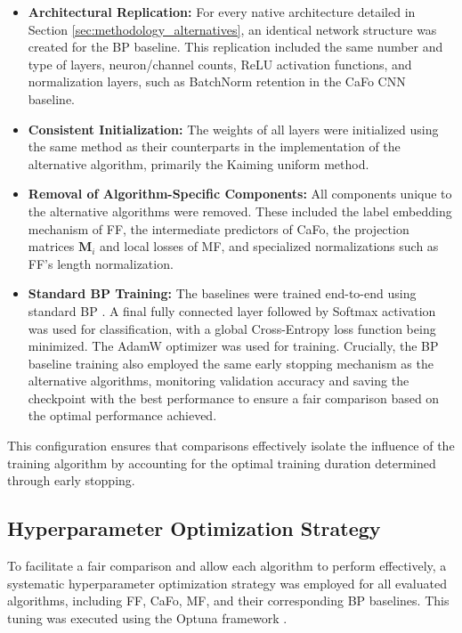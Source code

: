 \begin{itemize}
    \item \textbf{Architectural Replication:} For every native architecture detailed in Section \ref{sec:methodology_alternatives}, an identical network structure was created for the BP baseline. This replication included the same number and type of layers, neuron/channel counts, ReLU activation functions, and normalization layers, such as BatchNorm retention in the CaFo CNN baseline.
    \item \textbf{Consistent Initialization:} The weights of all layers were initialized using the same method as their counterparts in the implementation of the alternative algorithm, primarily the Kaiming uniform method.
    \item \textbf{Removal of Algorithm-Specific Components:} All components unique to the alternative algorithms were removed. These included the label embedding mechanism of FF, the intermediate predictors of CaFo, the projection matrices $\mathbf{M}_i$ and local losses of MF, and specialized normalizations such as FF's length normalization.
    \item \textbf{Standard BP Training:} The baselines were trained end-to-end using standard BP \cite{rumelhart1986learning}. A final fully connected layer followed by Softmax activation was used for classification, with a global Cross-Entropy loss function being minimized. The AdamW optimizer \cite{loshchilov2017decoupled} was used for training. Crucially, the BP baseline training also employed the same early stopping mechanism as the alternative algorithms, monitoring validation accuracy and saving the checkpoint with the best performance to ensure a fair comparison based on the optimal performance achieved.
\end{itemize}
This configuration ensures that comparisons effectively isolate the influence of the training algorithm by accounting for the optimal training duration determined through early stopping.

\subsection{Hyperparameter Optimization Strategy}
\label{sec:methodology_hyperparameters}
To facilitate a fair comparison and allow each algorithm to perform effectively, a systematic hyperparameter optimization strategy was employed for all evaluated algorithms, including FF, CaFo, MF, and their corresponding BP baselines. This tuning was executed using the Optuna framework \cite{akiba2019optuna}.

